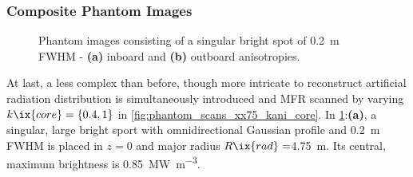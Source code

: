             \subsubsection*{Composite Phantom Images}%
%
                \begin{figure}%
                    \centering%
                    \caption{Phantom images consisting of a singular bright spot of \SI{0.2}{\meter} FWHM -  \textbf{(a)} inboard and \textbf{(b)} outboard anisotropies.}\label{fig:phantom_bright_spots_ani}%
                \end{figure}%
%
                At last, a less complex than before, though more intricate to reconstruct artificial radiation distribution is simultaneously introduced and MFR scanned by varying $k\ix{core}=\left\{0.4, 1\right\}$ in \cref{fig:phantom_scans_xx75_kani_core}. In \cref{fig:phantom_bright_spots_ani}:\textbf{(a)}, a singular, large bright sport with omnidirectional Gaussian profile and \SI{0.2}{\meter} FWHM is placed in $z=0$ and major radius $R\ix{rad}=$\SI{4.75}{\meter}. Its central, maximum brightness is \SI{0.85}{\mega\watt\per\cubic\meter}.\\%
%
